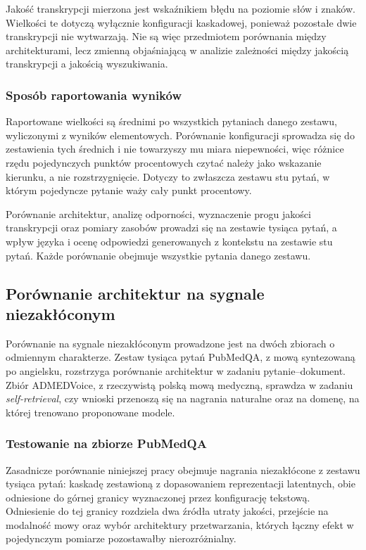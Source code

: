 Jakość transkrypcji mierzona jest wskaźnikiem błędu na poziomie słów i znaków. Wielkości te dotyczą
wyłącznie konfiguracji kaskadowej, ponieważ pozostałe dwie transkrypcji nie wytwarzają. Nie są więc
przedmiotem porównania między architekturami, lecz zmienną objaśniającą w analizie zależności między
jakością transkrypcji a jakością wyszukiwania.

\subsubsection{Sposób raportowania wyników}
Raportowane wielkości są średnimi po wszystkich pytaniach danego zestawu, wyliczonymi z wyników
elementowych. Porównanie konfiguracji sprowadza się do zestawienia tych średnich i nie towarzyszy
mu miara niepewności, więc różnice rzędu pojedynczych punktów procentowych czytać należy jako
wskazanie kierunku, a nie rozstrzygnięcie. Dotyczy to zwłaszcza zestawu stu pytań, w którym
pojedyncze pytanie waży cały punkt procentowy.

Porównanie architektur, analizę odporności, wyznaczenie progu jakości transkrypcji oraz pomiary
zasobów prowadzi się na zestawie tysiąca pytań, a wpływ języka i ocenę odpowiedzi generowanych
z kontekstu na zestawie stu pytań. Każde porównanie obejmuje wszystkie pytania danego zestawu.

\subsection{Porównanie architektur na sygnale niezakłóconym}
\label{sec:czyste}
Porównanie na sygnale niezakłóconym prowadzone jest na dwóch zbiorach o odmiennym charakterze.
Zestaw tysiąca pytań PubMedQA, z mową syntezowaną po angielsku, rozstrzyga porównanie architektur
w zadaniu pytanie--dokument. Zbiór ADMEDVoice, z rzeczywistą polską mową medyczną, sprawdza
w zadaniu \textit{self-retrieval}, czy wnioski przenoszą się na nagrania naturalne oraz na
domenę, na której trenowano proponowane modele.

\subsubsection{Testowanie na zbiorze PubMedQA}
Zasadnicze porównanie niniejszej pracy obejmuje nagrania niezakłócone z zestawu tysiąca pytań:
kaskadę zestawioną z dopasowaniem reprezentacji latentnych, obie odniesione do górnej granicy
wyznaczonej przez konfigurację tekstową. Odniesienie
do tej granicy rozdziela dwa źródła utraty jakości, przejście na modalność mowy oraz wybór
architektury przetwarzania, których łączny efekt w pojedynczym pomiarze pozostawałby
nierozróżnialny.

